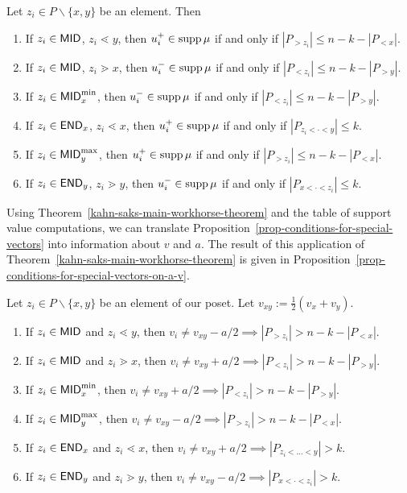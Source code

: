 \documentclass{puthesis-UG}
\begin{document}
\begin{prop} \label{prop-conditions-for-special-vectors}
    Let $z_i \in P \backslash \{x, y\}$ be an element. Then 
    \begin{enumerate}[label = (\alph*)]
        \item If $z_i \in \mathsf{MID}$, $z_i \lessdot y$, then $u_i^+ \in \operatorname{supp} \mu$ if and only if $|P_{> z_i}| \leq n-k-|P_{< x}|$. 
        \item If $z_i \in \mathsf{MID}$, $z_i \gtrdot x$, then $u^-_i \in \operatorname{supp} \mu$ if and only if $|P_{<z_i}| \leq n-k - |P_{>y}|$.
        \item If $z_i \in \mathsf{MID}_x^{\text{min}}$, then $u^-_i \in \operatorname{supp} \mu$ if and only if $|P_{<z_i}| \leq n-k - |P_{>y}|$.
        \item If $z_i \in \mathsf{END}_x$, $z_i \lessdot x$, then $u^+_i \in \operatorname{supp} \mu$ if and only if $|P_{z_i < \cdot < y}| \leq k$. 
        \item If $z_i \in \mathsf{MID}_y^{\text{max}}$, then $u_i^+ \in \operatorname{supp} \mu$ if and only if $|P_{>z_i}| \leq n-k-|P_{< x}|$.
        \item If $z_i \in \mathsf{END}_y$, $z_i \gtrdot y$, then $u^-_i \in \operatorname{supp} \mu$ if and only if $|P_{x < \cdot < z_i}| \leq k$. 
    \end{enumerate}
\end{prop}

Using Theorem~\ref{kahn-saks-main-workhorse-theorem} and the table of support value computations, we can translate Proposition~\ref{prop-conditions-for-special-vectors} into information about $v$ and $a$. The result of this application of Theorem~\ref{kahn-saks-main-workhorse-theorem} is given in Proposition~\ref{prop-conditions-for-special-vectors-on-a-v}.

\begin{prop} \label{prop-conditions-for-special-vectors-on-a-v}
	Let $z_i \in P \backslash \{x, y\}$ be an element of our poset. Let $v_{xy} := \frac{1}{2} (v_x + v_y)$. 
	\begin{enumerate}[label = (\alph*)]
		\item If $z_i \in \mathsf{MID}$ and $z_i \lessdot y$, then $v_i \neq v_{xy} - a/2 \implies |P_{> z_i}| > n-k - |P_{< x}|$. 
		\item If $z_i \in \mathsf{MID}$ and $z_i \gtrdot x$, then $v_i \neq v_{xy} + a/2 \implies |P_{< z_i}| > n-k-|P_{>y}|$. 
		\item If $z_i \in \mathsf{MID}_x^{\text{min}}$, then $v_i \neq v_{xy} + a/2 \implies |P_{<z_i}| > n-k-|P_{>y}|$.
		\item If $z_i \in \mathsf{MID}_y^{\text{max}}$, then $v_i \neq v_{xy} - a/2 \implies |P_{> z_i}| > n-k - |P_{< x}|$. 
		\item If $z_i \in \mathsf{END}_x$ and $z_i \lessdot x$, then $v_i \neq v_{xy} + a/2 \implies |P_{z_i < \ldots < y}| > k$. 
		\item If $z_i \in \mathsf{END}_y$ and $z_i \gtrdot y$, then $v_i \neq v_{xy} - a/2 \implies |P_{x < \cdot < z_i}| > k$. 
	\end{enumerate}
\end{prop}
\end{document}
